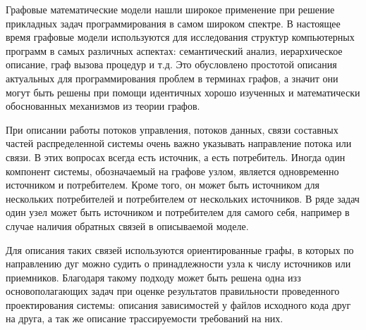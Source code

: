 




Графовые математические модели нашли широкое применение при решение прикладных задач программирования в самом широком спектре. В настоящее время графовые модели используются для исследования структур компьютерных программ в самых различных аспектах: семантический анализ, иерархическое описание, граф вызова процедур и т.д. Это обусловлено простотой описания актуальных для программирования проблем в терминах графов, а значит они могут быть решены при помощи идентичных хорошо изученных и математически обоснованных механизмов из теории графов.

При описании работы потоков управления, потоков данных, связи составных частей распределенной системы очень важно указывать направление потока или связи. В этих вопросах всегда есть источник, а есть потребитель. Иногда один компонент системы, обозначаемый на графове узлом, является одновременно источником и потребителем. Кроме того, он может быть источником для нескольких потребителей и потребителем от нескольких источников. В ряде задач один узел может быть источником и потребителем для самого себя, например в случае наличия обратных связей в описываемой моделе.

Для описания таких связей используются ориентированные графы, в которых по направлению дуг можно судить о принадлежности узла к числу источников или приемников. Благодаря такому подходу может быть решена одна изз основополагающих задач при оценке результатов правильности проведенного проектирования системы: описания зависимостей у файлов исходного кода друг на друга, а так же описание трассируемости требований на них.


